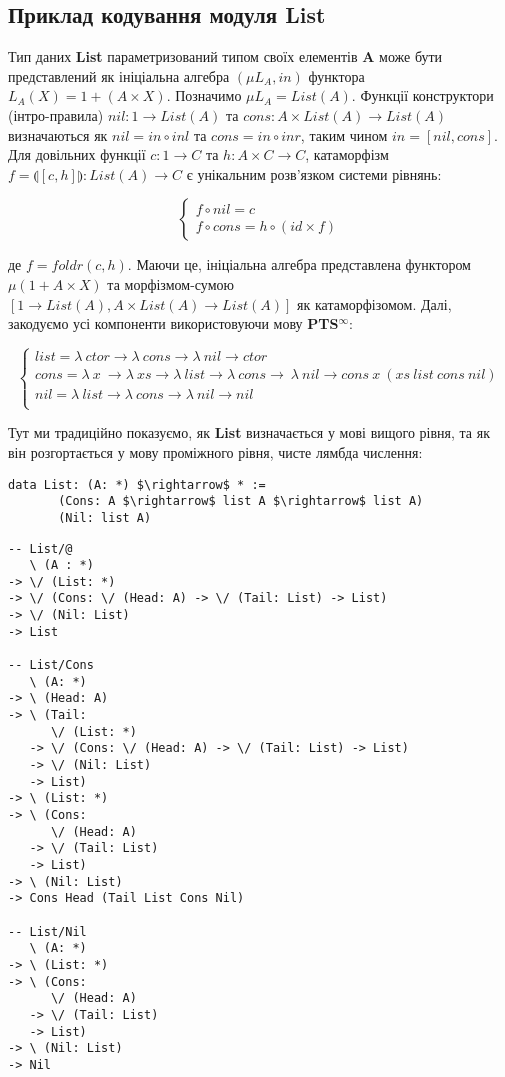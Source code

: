 \documentclass{article}
\begin{document}
\subsection{Приклад кодування модуля List}
Тип даних \textbf{List} параметризований типом своїх елементів \textbf{A} може бути представлений як
ініціальна алгебра $(\mu L_A, in)$ функтора $L_A(X) = 1 + (A \times X)$. Позначимо $\mu L_A = List(A)$.
Функції конструктори (інтро-правила) $nil: 1 \rightarrow List(A)$ та
$cons: A \times List(A) \rightarrow List(A)$ визначаються як
$nil = in \circ inl$ та $cons = in \circ inr$, таким чином $in = [nil,cons]$.
Для довільних функції $c: 1 \rightarrow C$ та $h: A \times C \rightarrow C$,
катаморфізм $f = \llparenthesis [c,h] \rrparenthesis : List(A) \rightarrow C$
є унікальним розв'язком системи рівнянь:

$$
\begin{cases}
  f \circ nil  = c \\
  f \circ cons = h \circ (id \times f)
\end{cases}
$$

де $f = foldr(c,h)$. Маючи це, ініціальна алгебра представлена функтором
$\mu (1 + A \times X)$ та морфізмом-сумою $[1 \rightarrow List(A), A \times List(A) \rightarrow List(A)]$
як катаморфізомом. Далі, закодуємо усі компоненти використовуючи мову \textbf{PTS$^\infty$}:

$$
\begin{cases}
list = \lambda\ ctor \rightarrow \lambda\ cons \rightarrow \lambda\ nil \rightarrow ctor\\
cons = \lambda\ x\ \rightarrow \lambda\ xs \rightarrow \lambda\ list \rightarrow \lambda\ cons \rightarrow\ \lambda\ nil \rightarrow cons\ x\ (xs\ list\ cons\ nil)\\
nil = \lambda\ list \rightarrow \lambda\ cons \rightarrow \lambda\ nil \rightarrow nil\\
\end{cases}
$$

Тут ми традиційно показуємо, як {\bf List} визначається у мові вищого рівня,
та як він розгортається у мову проміжного рівня, чисте лямбда числення:

\begin{lstlisting}[mathescape=true]
  data List: (A: *) $\rightarrow$ * :=
       (Cons: A $\rightarrow$ list A $\rightarrow$ list A)
       (Nil: list A)
\end{lstlisting}

\begin{lstlisting}[mathescape=true]
-- List/@
   \ (A : *)
-> \/ (List: *)
-> \/ (Cons: \/ (Head: A) -> \/ (Tail: List) -> List)
-> \/ (Nil: List)
-> List

-- List/Cons
   \ (A: *)
-> \ (Head: A)
-> \ (Tail:
      \/ (List: *)
   -> \/ (Cons: \/ (Head: A) -> \/ (Tail: List) -> List)
   -> \/ (Nil: List)
   -> List)
-> \ (List: *)
-> \ (Cons:
      \/ (Head: A)
   -> \/ (Tail: List)
   -> List)
-> \ (Nil: List)
-> Cons Head (Tail List Cons Nil)

-- List/Nil
   \ (A: *)
-> \ (List: *)
-> \ (Cons:
      \/ (Head: A)
   -> \/ (Tail: List)
   -> List)
-> \ (Nil: List)
-> Nil
\end{lstlisting}
\end{document}
